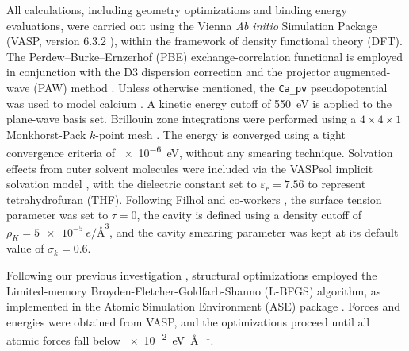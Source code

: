 \documentclass[twoside,twocolumn,9pt]{article}
\begin{document}
All calculations, including geometry optimizations and binding energy evaluations, were carried out using the Vienna \textit{Ab initio} Simulation Package (VASP, version 6.3.2 \cite{kresse1996efficiency,kresse1996efficient,kresseUltrasoftPseudopotentialsProjector1999}), within the framework of density functional theory (DFT). 
The Perdew--Burke--Ernzerhof (PBE) exchange-correlation functional is employed in conjunction with the D3 dispersion correction and the projector augmented-wave (PAW) method \cite{blochlProjectorAugmentedwaveMethod1994}. 
Unless otherwise mentioned, the \texttt{Ca\_pv} pseudopotential was used to model calcium \cite{blochlProjectorAugmentedwaveMethod1994,kresseUltrasoftPseudopotentialsProjector1999}. A kinetic energy cutoff of \SI{550}{\electronvolt} is applied to the plane-wave basis set. Brillouin zone integrations were performed using a $4 \times 4 \times 1$ Monkhorst-Pack $k$-point mesh \cite{monkhorstSpecialPointsBrillouinzone1976}.  
The energy is converged using a tight convergence criteria of \SI{e-6}{\electronvolt}, without any smearing technique.
Solvation effects from outer solvent molecules were included via the VASPsol implicit solvation model \cite{mathewImplicitSolvationModel2014,mathewImplicitSelfconsistentElectrolyte2019}, with the dielectric constant set to $\varepsilon_r = 7.56$ to represent tetrahydrofuran (THF). 
Following Filhol and co-workers \cite{kopaclautarElectrolyteReactivityDouble2020,kopaclautarModelingInterfacialElectrochemistry2020,hagopianInitioModellingInterfacial2021,nguyenSolvationReductionCoupling2023}, the surface tension parameter was set to $\tau = 0$, the cavity is defined using a density cutoff of $\rho_K = \SI{5e-5}{\elementarycharge\per\angstrom\cubed}$, and the cavity smearing parameter was kept at its default value of $\sigma_k = 0.6$.

Following our previous investigation \cite{beaujeanBinding2025}, structural optimizations employed the Limited-memory Broyden-Flet\-cher-Gol\-dfarb-Shanno (L-BFGS) algorithm, as implemented in the Atomic Simulation Environment (ASE) package \cite{larsenAtomicSimulationEnvironment2017}. 
Forces and energies were obtained from VASP, and the optimizations proceed until all atomic forces fall below \SI{e-2}{\electronvolt\per\angstrom}. 
\end{document}
